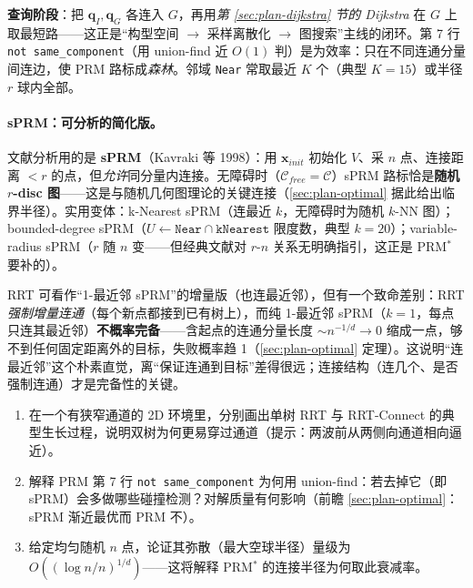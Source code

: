 \noindent\textbf{查询阶段}：把 $\mathbf{q}_I,\mathbf{q}_G$ 各连入 $G$，再用\emph{第 \ref{sec:plan-dijkstra} 节的 Dijkstra} 在 $G$ 上取最短路——这正是“构型空间 $\to$ 采样离散化 $\to$ 图搜索”主线的闭环。第 7 行 \texttt{not same\_component}（用 union-find 近 $O(1)$ 判）是为效率：只在不同连通分量间连边，使 PRM 路标成\emph{森林}。邻域 \texttt{Near} 常取最近 $K$ 个（典型 $K=15$）或半径 $r$ 球内全部。

\paragraph{sPRM：可分析的简化版。}
文献分析用的是 \textbf{sPRM}（Kavraki 等 1998）：用 $\mathbf{x}_{init}$ 初始化 $V$、采 $n$ 点、连接距离 $<r$ 的点，但\emph{允许}同分量内连接。无障碍时（$\mathcal{C}_{free}=\mathcal{C}$）sPRM 路标恰是\textbf{随机 $r$-disc 图}——这是与随机几何图理论的关键连接（\cref{sec:plan-optimal} 据此给出临界半径）。实用变体：k-Nearest sPRM（连最近 $k$，无障碍时为随机 $k$-NN 图）；bounded-degree sPRM（$U\leftarrow\texttt{Near}\cap\texttt{kNearest}$ 限度数，典型 $k=20$）；variable-radius sPRM（$r$ 随 $n$ 变——但经典文献对 $r$-$n$ 关系无明确指引，这正是 PRM$^*$ 要补的）。

\begin{pitfall}
RRT 可看作“1-最近邻 sPRM”的增量版（也连最近邻），但有一个致命差别：RRT \emph{强制增量连通}（每个新点都接到已有树上），而纯 1-最近邻 sPRM（$k=1$，每点只连其最近邻）\textbf{不概率完备}——含起点的连通分量长度 $\sim n^{-1/d}\to0$ 缩成一点，够不到任何固定距离外的目标，失败概率趋 1（\cref{sec:plan-optimal} 定理）。这说明“连最近邻”这个朴素直觉，离“保证连通到目标”差得很远；连接结构（连几个、是否强制连通）才是完备性的关键。
\end{pitfall}

\begin{practice}
\begin{enumerate}
  \item 在一个有狭窄通道的 2D 环境里，分别画出单树 RRT 与 RRT-Connect 的典型生长过程，说明双树为何更易穿过通道（提示：两波前从两侧向通道相向逼近）。
  \item 解释 PRM 第 7 行 \texttt{not same\_component} 为何用 union-find：若去掉它（即 sPRM）会多做哪些碰撞检测？对解质量有何影响（前瞻 \cref{sec:plan-optimal}：sPRM 渐近最优而 PRM 不）。
  \item 给定均匀随机 $n$ 点，论证其弥散（最大空球半径）量级为 $O((\log n/n)^{1/d})$——这将解释 PRM$^*$ 的连接半径为何取此衰减率。
\end{enumerate}
\end{practice}

